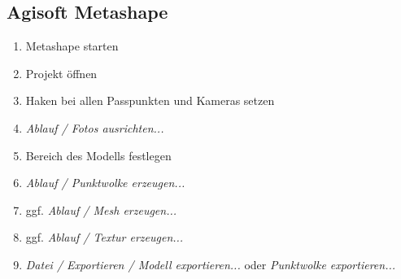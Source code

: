 \documentclass[./00PhotoBox.tex]{subfiles}
\begin{document}
\subsection{Agisoft Metashape}
\begin{enumerate}
    \item Metashape starten
    \item Projekt öffnen
    \item Haken bei allen Passpunkten und Kameras setzen
    \item \textit{Ablauf / Fotos ausrichten...}
    \item Bereich des Modells festlegen
    \item \textit{Ablauf / Punktwolke erzeugen...}
    \item ggf. \textit{Ablauf / Mesh erzeugen...}
    \item ggf. \textit{Ablauf / Textur erzeugen...}
    \item \textit{Datei / Exportieren / Modell exportieren...} oder \textit{Punktwolke exportieren...}
\end{enumerate}

\biblio
\end{document}
